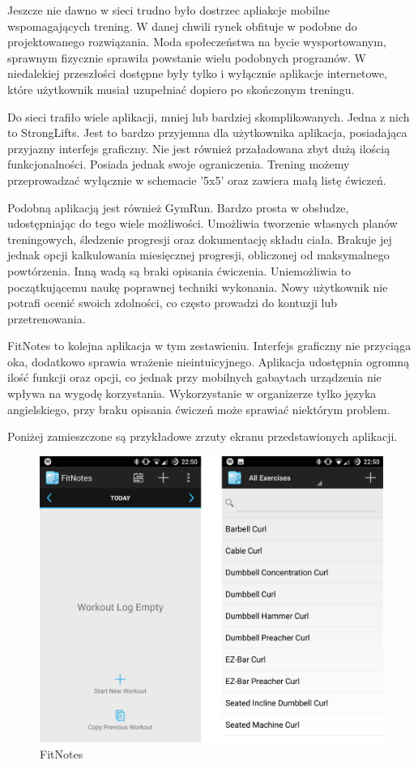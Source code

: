 Jeszcze nie dawno w sieci trudno było dostrzec apliakcje mobilne wspomagających trening. W danej chwili rynek obfituje w podobne do projektowanego rozwiązania. Moda społeczeństwa na bycie wysportowanym, sprawnym fizycznie sprawiła powstanie wielu podobnych programów. W niedalekiej przeszłości dostępne były tylko i wyłącznie aplikacje internetowe, które użytkownik musiał uzupełniać dopiero po skończonym treningu.

Do sieci trafiło wiele aplikacji, mniej lub bardziej skomplikowanych. Jedna z nich to StrongLifts. Jest to bardzo przyjemna dla użytkownika aplikacja, posiadająca przyjazny interfejs graficzny. Nie jest również przaładowana zbyt dużą ilością funkcjonalności. Posiada jednak swoje ograniczenia. Trening możemy przeprowadzać wyłącznie w schemacie  '5x5' oraz zawiera małą listę ćwiczeń.

Podobną aplikacją jest również GymRun. Bardzo prosta w obsłudze, udostępniając do tego wiele możliwości. Umożliwia tworzenie własnych planów treningowych, śledzenie progresji oraz dokumentację składu ciała. Brakuje jej jednak opcji kalkulowania miesięcznej progresji, obliczonej od maksymalnego powtórzenia.  Inną wadą są braki opisania ćwiczenia. Uniemożliwia to początkującemu naukę poprawnej techniki wykonania. Nowy użytkownik nie potrafi ocenić swoich zdolności, co często prowadzi do kontuzji lub przetrenowania.

FitNotes to kolejna aplikacja w tym zestawieniu. Interfejs graficzny nie przyciąga oka, dodatkowo sprawia wrażenie nieintuicyjnego. Aplikacja udostępnia ogromną ilość funkcji oraz opcji, co jednak przy mobilnych gabaytach urządzenia nie wpływa na wygodę korzystania. Wykorzystanie w organizerze tylko języka angielskiego, przy braku opisania ćwiczeń może sprawiać niektórym problem.

Poniżej zamieszczone są przykładowe zrzuty ekranu przedstawionych aplikacji.

\begin{figure}[H]
\centering
\includegraphics[width=\textwidth, keepaspectratio=true]{grafika/istn1.jpg} 
	\caption{ FitNotes }
\end{figure}

